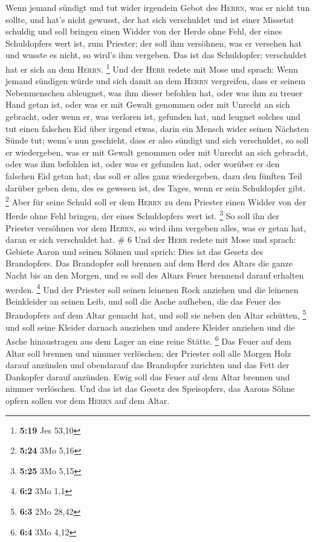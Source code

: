  Wenn jemand sündigt und tut wider irgendein Gebot des
\textsc{Herrn}, was er nicht tun sollte, und hat's nicht gewusst, der
hat sich verschuldet und ist einer Missetat schuldig  und
soll bringen einen Widder von der Herde ohne Fehl, der eines
Schuldopfers wert ist, zum Priester; der soll ihm versöhnen, was er
versehen hat und wusste es nicht, so wird's ihm vergeben.
 Das ist das Schuldopfer; verschuldet hat er sich an dem
\textsc{Herrn}. \footnote{\textbf{5:19} Jes 53,10}  Und
der \textsc{Herr} redete mit Mose und sprach:  Wenn
jemand sündigen würde und sich damit an dem \textsc{Herrn} vergreifen,
dass er seinem Nebenmenschen ableugnet, was ihm dieser befohlen hat,
oder was ihm zu treuer Hand getan ist, oder was er mit Gewalt genommen
oder mit Unrecht an sich gebracht,  oder wenn er, was
verloren ist, gefunden hat, und leugnet solches und tut einen falschen
Eid über irgend etwas, darin ein Mensch wider seinen Nächsten Sünde tut;
 wenn's nun geschieht, dass er also sündigt und sich
verschuldet, so soll er wiedergeben, was er mit Gewalt genommen oder mit
Unrecht an sich gebracht, oder was ihm befohlen ist, oder was er
gefunden hat,  oder worüber er den falschen Eid getan
hat; das soll er alles ganz wiedergeben, dazu den fünften Teil darüber
geben dem, des es gewesen ist, des Tages, wenn er sein Schuldopfer gibt.
\footnote{\textbf{5:24} 3Mo 5,16}  Aber für seine Schuld
soll er dem \textsc{Herrn} zu dem Priester einen Widder von der Herde
ohne Fehl bringen, der eines Schuldopfers wert ist. \footnote{\textbf{5:25}
  3Mo 5,15}  So soll ihn der Priester versöhnen vor dem
\textsc{Herrn}, so wird ihm vergeben alles, was er getan hat, daran er
sich verschuldet hat. \# 6  Und der \textsc{Herr} redete
mit Mose und sprach:  Gebiete Aaron und seinen Söhnen und
sprich: Dies ist das Gesetz des Brandopfers. Das Brandopfer soll brennen
auf dem Herd des Altars die ganze Nacht bis an den Morgen, und es soll
des Altars Feuer brennend darauf erhalten werden. \footnote{\textbf{6:2}
  3Mo 1,1}  Und der Priester soll seinen leinenen Rock
anziehen und die leinenen Beinkleider an seinen Leib, und soll die Asche
aufheben, die das Feuer des Brandopfers auf dem Altar gemacht hat, und
soll sie neben den Altar schütten, \footnote{\textbf{6:3} 2Mo 28,42}
 und soll seine Kleider darnach ausziehen und andere
Kleider anziehen und die Asche hinaustragen aus dem Lager an eine reine
Stätte. \footnote{\textbf{6:4} 3Mo 4,12}  Das Feuer auf
dem Altar soll brennen und nimmer verlöschen; der Priester soll alle
Morgen Holz darauf anzünden und obendarauf das Brandopfer zurichten und
das Fett der Dankopfer darauf anzünden.  Ewig soll das
Feuer auf dem Altar brennen und nimmer verlöschen.  Und
das ist das Gesetz des Speisopfers, das Aarons Söhne opfern sollen vor
dem \textsc{Herrn} auf dem Altar.

